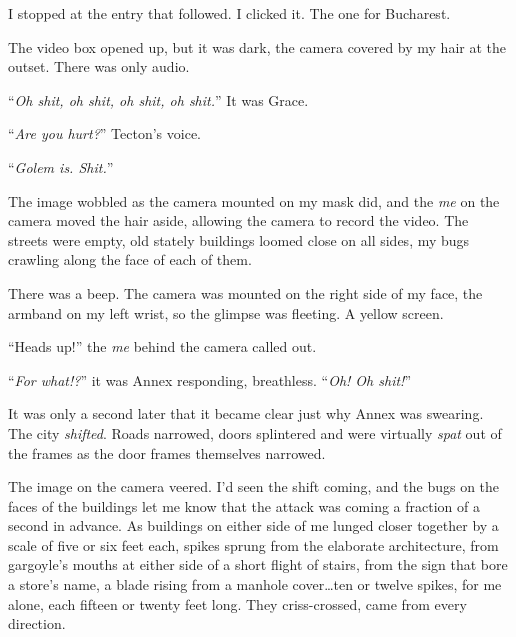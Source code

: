 I stopped at the entry that followed.  I clicked it.  The one for Bucharest.



The video box opened up, but it was dark, the camera covered by my hair at the outset. There was only audio.



``\emph{Oh shit, oh shit, oh shit, oh shit.}''  It was Grace.



``\emph{Are you hurt?}''  Tecton's voice.



``\emph{Golem is.  Shit.}''



The image wobbled as the camera mounted on my mask did, and the \emph{me} on the camera moved the hair aside, allowing the camera to record the video.  The streets were empty, old stately buildings loomed close on all sides, my bugs crawling along the face of each of them.



There was a beep.  The camera was mounted on the right side of my face, the armband on my left wrist, so the glimpse was fleeting.  A yellow screen.



``Heads up!'' the \emph{me} behind the camera called out.



``\emph{For what!?}'' it was Annex responding, breathless.  ``\emph{Oh!  Oh shit!}''



It was only a second later that it became clear just why Annex was swearing.  The city \emph{shifted}.  Roads narrowed, doors splintered and were virtually \emph{spat} out of the frames as the door frames themselves narrowed.



The image on the camera veered.  I'd seen the shift coming, and the bugs on the faces of the buildings let me know that the attack was coming a fraction of a second in advance.  As buildings on either side of me lunged closer together by a scale of five or six feet each, spikes sprung from the elaborate architecture, from gargoyle's mouths at either side of a short flight of stairs, from the sign that bore a store's name, a blade rising from a manhole cover\ldots ten or twelve spikes, for me alone, each fifteen or twenty feet long.  They criss-crossed, came from every direction.



